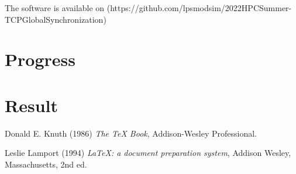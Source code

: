 \documentclass{article}
\begin{document}
The software is available on (https://github.com/lpsmodsim/2022HPCSummer-TCPGlobalSynchronization)

\section{Progress}


\section{Result} %



\begin{thebibliography}{9}
Donald E. Knuth (1986) \emph{The \TeX{} Book}, Addison-Wesley Professional.

Leslie Lamport (1994) \emph{\LaTeX: a document preparation system}, Addison
Wesley, Massachusetts, 2nd ed.
\end{thebibliography}
\end{document}
